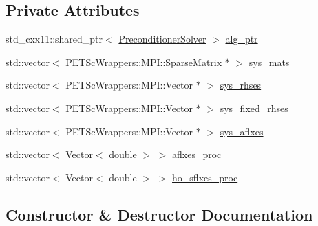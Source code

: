 \subsection*{Private Attributes}
\begin{DoxyCompactItemize}
\item 
std\+\_\+cxx11\+::shared\+\_\+ptr$<$ \hyperlink{class_preconditioner_solver}{Preconditioner\+Solver} $>$ \hyperlink{class_equation_base_aa4b83dfa34d4588cf3250a21ffc2e984}{alg\+\_\+ptr}
\item 
std\+::vector$<$ P\+E\+T\+Sc\+Wrappers\+::\+M\+P\+I\+::\+Sparse\+Matrix $\ast$ $>$ \hyperlink{class_equation_base_afcdb76718da046b950c466500de44a03}{sys\+\_\+mats}
\item 
std\+::vector$<$ P\+E\+T\+Sc\+Wrappers\+::\+M\+P\+I\+::\+Vector $\ast$ $>$ \hyperlink{class_equation_base_a89fe13a13fa7f46cc20bdab8a884216c}{sys\+\_\+rhses}
\item 
std\+::vector$<$ P\+E\+T\+Sc\+Wrappers\+::\+M\+P\+I\+::\+Vector $\ast$ $>$ \hyperlink{class_equation_base_a556e9d3b402dae0303e786e2ef38a29b}{sys\+\_\+fixed\+\_\+rhses}
\item 
std\+::vector$<$ P\+E\+T\+Sc\+Wrappers\+::\+M\+P\+I\+::\+Vector $\ast$ $>$ \hyperlink{class_equation_base_afe48e9f1d2f6b4f13cefe80d43d18300}{sys\+\_\+aflxes}
\item 
std\+::vector$<$ Vector$<$ double $>$ $>$ \hyperlink{class_equation_base_aa5a26770211dc6c8b2c17e35deffa60b}{aflxes\+\_\+proc}
\item 
std\+::vector$<$ Vector$<$ double $>$ $>$ \hyperlink{class_equation_base_a25123cf5f335e267799a52420396a276}{ho\+\_\+sflxes\+\_\+proc}
\end{DoxyCompactItemize}


\subsection{Constructor \& Destructor Documentation}
\mbox{\label{class_equation_base_a1e027696da2ab5a030daa34bf99430fe}} 
